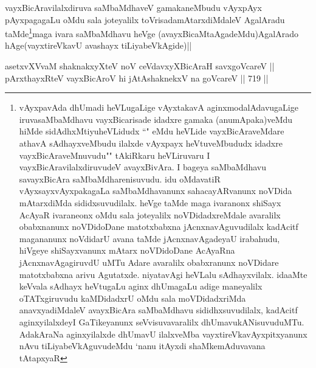 \begin{artha}
vayxBicAravilalxdiruva saMbaMdhaveV gamakaneMbudu vAyxpAyx pAyxpagagaLu oMdu sala joteyalilx toVrisadamAtarxdiMdaleV AgalAradu taMde\footnote{vAyxpavAda dhUmadi heVLugaLige vAyxtakavA aginxmodalAdavugaLige iruvasaMbaMdhavu vayxBicarisade idadxre gamaka (anumApaka)veMdu hiMde sidAdhxMtiyuheVLidudx ``\stext" eMdu heVLide vayxBicAraveMdare athavA sAdhayxveMbudu ilalxde vAyxpayx heVtuveMbududx idadxre vayxBicAraveMnuvudu"\stext" tAkiRkaru heVLiruvaru I vayxBicAravilalxdiruvudeV avayxBivAra. I bageya saMbaMdhavu savayxBicAra saMbaMdharenisuvudu. idu oMdavatiR vAyxsayxvAyxpakagaLa saMbaMdhavanunx sahacayARvanunx noVDida mAtarxdiMda sididxsuvudilalx. heVge taMde maga ivaranonx shiSayx AcAyaR ivaraneonx oMdu sala joteyalilx noVDidadxreMdale avaralilx obabxnanunx noVDidoDane matotxbabxna jAcnxnavAguvudilalx kadAcitf magananunx noVdidarU avana taMde jAcnxnavAgadeyaU irabahudu, hiVgeye shiSayxvanunx mAtarx noVDidoDane AcAyaRna jAcnxnavAgagiruvdU uMTu  Adare avaralilx obabxranunx noVDidare matotxbabxna arivu Agutatxde. niyatavAgi heVLalu sAdhayxvilalx. idaaMte keVvala sAdhayx heVtugaLu aginx dhUmagaLu adige maneyalilx oTATxgiruvudu kaMDidadxrU oMdu sala moVDidadxriMda anavxyadiMdaleV avayxBicAra saMbaMdhavu sididhxsuvudilalx, kadAcitf aginxyilalxdeyI GaTikeyanunx seVvisuvavaralilx dhUmavukANisuvuduMTu. AdakAraNa aginxyilalxde dhUmavU ilalxveMba vayxtireVkavAyxpitxyanunx nAvu tiLiyabeVkAguvudeMdu `nanu itAyxdi shaMkemAduvavana tAtapxyaR}maga ivara saMbaMdhavu heVge (avayxBicaMtaAgadeMdu)AgalArado hAge(vayxtireVkavU avashayx tiLiyabeVkAgide)||
\end{artha}


\begin{shl}
asetxvXVvaM shaknakxyXteV noV ceVdavxyXBicAraH savxgoVcareV || \\
pArxthayxRteV vayxBicAroV hi jAtAshaknekxV na goVcareV ||  719 ||  
\end{shl}

